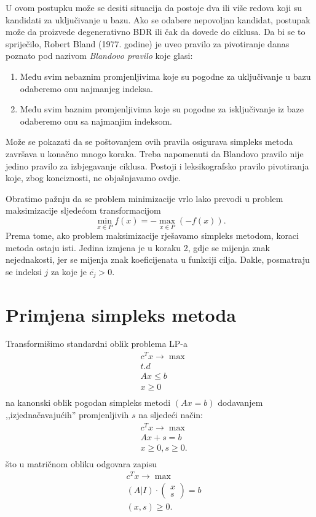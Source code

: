 \documentclass[a4paper, utf8, 11pt, colorlinks]{book}
\theoremstyle{definition}
\begin{document}
U ovom postupku  može se desiti situacija da postoje dva ili više redova koji su kandidati za uključivanje u bazu. Ako se odabere nepovoljan kandidat, postupak može da proizvede degenerativno BDR ili čak da dovede do ciklusa. 
Da bi se to spriječilo, Robert Bland (1977. godine) je uveo pravilo za pivotiranje danas poznato pod
nazivom \emph{Blandovo pravilo} koje glasi:
\begin{enumerate}
	\item   Među svim nebaznim promjenljivima koje su pogodne za uključivanje u bazu odaberemo onu najmanjeg indeksa. 
    \item Među svim baznim promjenljivima koje su pogodne za isključivanje iz baze odaberemo onu sa najmanjim indeksom.
\end{enumerate}
Može se pokazati da se poštovanjem ovih pravila osigurava simpleks metoda  završava u konačno mnogo koraka. Treba napomenuti da Blandovo pravilo nije jedino pravilo za izbjegavanje ciklusa. Postoji i leksikografsko pravilo pivotiranja koje, zbog konciznosti, ne objašnjavamo ovdje.  

Obratimo pažnju da se problem minimizacije vrlo lako prevodi u problem maksimizacije sljedećom transformacijom
$$ \min_{ x \in P} f(x) = - \max_{x \in P}(-f(x)).$$ 
Prema tome, ako  problem maksimizacije rješavamo simpleks metodom, koraci metoda ostaju isti. Jedina izmjena je u koraku 2, gdje se mijenja znak nejednakosti, jer se mijenja znak koeficijenata u funkciji cilja.  Dakle, posmatraju se indeksi $j$ za koje je $\overline{c_j} > 0$.

\section{Primjena simpleks metoda}
Transformišimo standardni oblik problema LP-a
  \begin{align*}
    & c^T x \rightarrow \max \\
    & {t.d} \nonumber \\
    & Ax \leq b \\
    & x \geq 0\\
\end{align*}
na kanonski oblik pogodan simpleks metodi $(A {x} = b)$ dodavanjem ,,izjednačavajućih'' promjenljivih $s$ na sljedeći način:
\begin{align}
    & c^T x \rightarrow \max \\
    & Ax + s =  b \\
    & x \geq 0, s \geq 0. \\
\end{align}
što u matričnom obliku odgovara zapisu
\begin{align}
    & c^T x \rightarrow \max \\
    & (A | I) \cdot \left (\begin{array}{c}
         x  \\
         s 
    \end{array} \right ) =  b \\
    & (x, s) \geq 0. \\
\end{align} 
\end{document}
